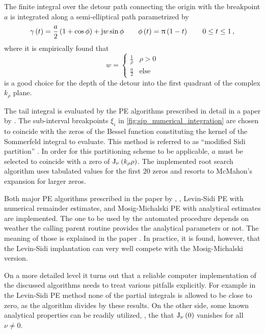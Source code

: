 The finite integral over the detour path connecting the origin with the
breakpoint $a$ is integrated along a semi-elliptical path parametrized by
\begin{equation}
    \gamma \left(t\right)
    =
    \frac{a}{2}
    \left(1 + \cos \phi\right)
    +
    \mathrm{j} w \sin \phi
    \qquad
    \phi \left(t\right)
    =
    \uppi \left(1 - t\right)
    \qquad
    0 \leq t \leq 1
    \, ,
\end{equation}
where it is empirically found that
\begin{equation}
    w = 
    \begin{cases}
        \frac{1}{\rho}  & \rho > 0 \\
        \frac{a}{2}     & \mathrm{else}
    \end{cases}
\end{equation}
is a good choice for the depth of the detour into the first quadrant of the 
complex $k_\rho$ plane.

The tail integral is evaluated by the \ac{PE} algorithms prescribed in detail
in a paper by \textcite{Michalski2016a}.
The sub-interval breakpoints $\xi_i$ in \cref{fig:sip_numerical_integration} 
are chosen to coincide with the zeros of the Bessel function constituting the
kernel of the Sommerfeld integral to evaluate.
This method is referred to as \enquote{modified Sidi partition}
\cite{Michalski2016a}.
In order for this partitioning scheme to be applicable, $a$ must be selected
to coincide with a zero of $\operatorname{J}_{\nu}\left(k_\rho \rho\right)$.
The implemented root search algorithm uses tabulated values
\cite[p.~409]{Abramowitz2014} for the first $\num{20}$ zeros and resorts to
McMahon's \cite[p.~236]{Olver2010} expansion for larger zeros.

Both major \ac{PE} algorithms prescribed in the paper by
\textcite{Michalski2016a}, \ie, Levin-Sidi \ac{PE} with numerical remainder
estimates, and Mosig-Michalski \ac{PE} with analytical estimates
are implemented.
The one to be used by the automated procedure depends on weather the calling
parent routine provides the analytical parameters or not.
The meaning of those is explained in the paper \cite[eq.~(70)]{Michalski2016a}.
In practice, it is found, however, that the Levin-Sidi implantation can very 
well compete with the Mosig-Michalski version.

On a more detailed level it turns out that a reliable computer implementation
of the discussed algorithms needs to treat various pitfalls explicitly.
For example in the Levin-Sidi \ac{PE} method none of the partial integrals is
allowed to be close to zero, as the algorithm divides by these results.
On the other side, some known analytical properties can be readily utilized,
\eg, the that $\operatorname{J}_{\nu} \left(0\right)$ vanishes for all $\nu \neq 0$.






